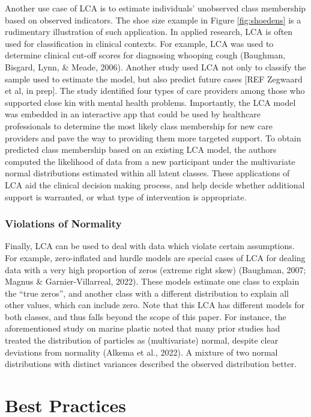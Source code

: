 \documentclass[
  ,man,floatsintext]{apa6}
\begin{document}
Another use case of LCA is to estimate individuals' unobserved class membership based on observed indicators.
The shoe size example in Figure \ref{fig:shoedens}
is a rudimentary illustration of such application.
In applied research, LCA is often used for classification in clinical contexts.
For example, LCA was used to determine clinical cut-off scores for diagnosing whooping cough (Baughman, Bisgard, Lynn, \& Meade, 2006).
Another study used LCA not only to classify the sample used to estimate the model, but also predict future cases {[}REF Zegwaard et al, in prep{]}.
The study identified four types of care providers among those who supported close kin with mental health problems.
Importantly, the LCA model was embedded in an interactive app that could be used by healthcare professionals to determine the most likely class membership for new care providers and pave the way to providing them more targeted support.
To obtain predicted class membership based on an existing LCA model,
the authors computed the likelihood of data from a new participant under the multivariate normal distributions estimated within all latent classes.
These applications of LCA aid the clinical decision making process,
and help decide whether additional support is warranted,
or what type of intervention is appropriate.

\hypertarget{violations-of-normality}{%
\subsubsection{Violations of Normality}\label{violations-of-normality}}

Finally, LCA can be used to deal with data which violate certain assumptions.
For example, zero-inflated and hurdle models are special cases of LCA for dealing data with a very high proportion of zeros (extreme right skew) (Baughman, 2007; Magnus \& Garnier-Villarreal, 2022).
These models estimate one class to explain the ``true zeros'',
and another class with a different distribution to explain all other values, which can include zero.
Note that this LCA has different models for both classes,
and thus falls beyond the scope of this paper.
For instance, the aforementioned study on marine plastic noted that many prior studies had treated the distribution of particles as (multivariate) normal, despite clear deviations from normality (Alkema et al., 2022).
A mixture of two normal distributions with distinct variances described the observed distribution better.

\hypertarget{best-practices}{%
\section{Best Practices}\label{best-practices}}
\end{document}
